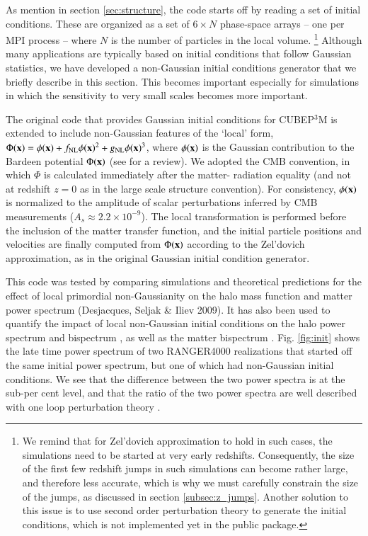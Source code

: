 \documentclass[useAMS,usenatbib]{mn2e}
\begin{document}
As mention in section \ref{sec:structure}, the code starts off by reading a set of initial conditions.
These are organized as a set of $6 \times N$ phase-space arrays -- one per {\small MPI} process -- where $N$ is the number of particles in the
local volume. \footnote{We remind that for Zel'dovich approximation to hold in such cases, the simulations need to be started at very early redshifts.
Consequently, the size of the first few redshift jumps in such simulations can become rather large, and therefore less accurate, 
which is why we must carefully constrain the size of the jumps, as discussed in section \ref{subsec:z_jumps}.
Another solution to this issue is to use second order perturbation theory to generate the initial conditions,
which is not implemented yet in the public package.}
Although many applications are typically based on initial conditions that follow Gaussian statistics,
we have developed a non-Gaussian initial conditions generator that we briefly describe in this section. 
This becomes important especially for simulations in which the sensitivity to very small scales becomes more important.

The original code that provides Gaussian initial conditions for {\small CUBEP$^3$M} 
is extended to include non-Gaussian features of the `local' form,
$\Phi({\bf x})=\phi({\bf x})+f_{\rm NL} \phi({\bf x})^2 + g_{\rm NL} 
\phi({\bf x})^3$, where $\phi({\bf x})$ is the Gaussian contribution
to the Bardeen potential $\Phi({\bf x})$ (see \cite{2004PhR...402..103B} for a review). 
We adopted the CMB convention,
in which $\Phi$ is calculated immediately after the matter-
radiation equality (and not at redshift $z=0$ as in the large scale
structure convention). For consistency, $\phi({\bf x})$ is normalized
to the amplitude of scalar perturbations inferred by CMB measurements
($A_s\approx 2.2 \times 10^{-9}$). The local transformation is performed 
before the inclusion of the matter transfer function, and the initial 
particle positions and velocities are finally computed from $\Phi({\bf x})$ 
according to the Zel'dovich approximation, as in the original Gaussian initial condition generator.

This code was tested by comparing simulations and theoretical predictions
for the effect of local primordial non-Gaussianity on the halo mass 
function and matter power spectrum (Desjacques, Seljak \& Iliev 2009). 
It has also been used to quantify the impact of local non-Gaussian initial
conditions on the halo power spectrum \citep{2009MNRAS.396...85D,
2010PhRvD..81b3006D} and bispectrum \citep{2010MNRAS.406.1014S},
 as well as the matter bispectrum \citep{2011arXiv1111.6966S}.
Fig. \ref{fig:init} shows the late time power spectrum of two RANGER4000 realizations that started off the same initial power spectrum, 
but one of which had non-Gaussian initial conditions.
We see that the difference between the two power spectra is at the sub-per cent level, and that the ratio of the two power spectra
are well described with one loop perturbation theory \citep{2004PhRvD..69j3513S,2008PhRvD..78l3534T}.
\end{document}
